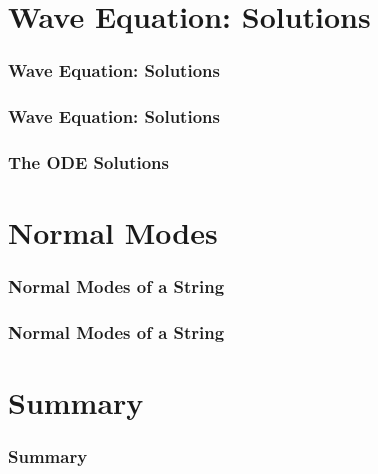 \documentclass[pdf, hideothersubsections]{beamer}
\begin{document}
\section{Wave Equation: Solutions}
\begin{frame}
\frametitle{Wave Equation: Solutions}

\end{frame}


\begin{frame}
\frametitle{Wave Equation: Solutions}

\end{frame}

\begin{frame}
\frametitle{The ODE Solutions}

\end{frame}

\section{Normal Modes}
\begin{frame}
\frametitle{Normal Modes of a String}

\end{frame}

\begin{frame}
\frametitle{Normal Modes of a String}

\end{frame}

\section{Summary}
\begin{frame}
\frametitle{Summary}


\end{frame}
\end{document}
